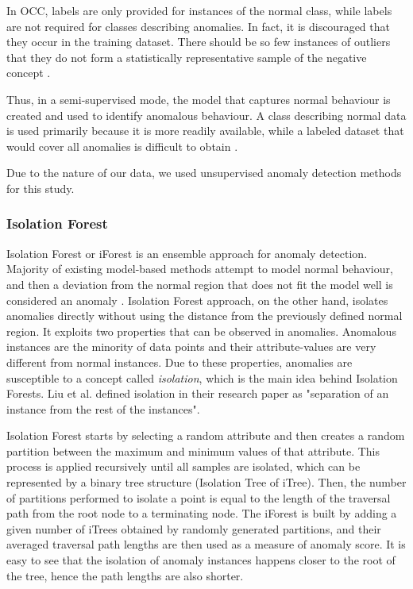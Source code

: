 In OCC, labels are only provided for instances of the normal class, while labels are not required for classes describing anomalies. In fact, it is discouraged that they occur in the training dataset. There should be so few instances of outliers that they do not form a statistically representative sample of the negative concept \cite{khan_madden_2014}.
 
Thus, in a semi-supervised mode, the model that captures normal behaviour is created and used to identify anomalous behaviour. A class describing normal data is used primarily because it is more readily available, while a labeled dataset that would cover all anomalies is difficult to obtain \cite{cvbakv2009}.
 
Due to the nature of our data, we used unsupervised anomaly detection methods for this study.

\subsubsection{Isolation Forest}
\label{section:lrIsolationForest}
Isolation Forest or iForest \cite{liu2012isolation} is an ensemble approach for anomaly detection. Majority of existing model-based methods attempt to model normal behaviour, and then a deviation from the normal region that does not fit the model well is considered an anomaly \cite{introToDataMining2005}. Isolation Forest approach, on the other hand, isolates anomalies directly without using the distance from the previously defined normal region. It exploits two properties that can be observed in anomalies. Anomalous instances are the minority of data points and their attribute-values are very different from normal instances. Due to these properties, anomalies are susceptible to a concept called \textit{isolation}, which is the main idea behind Isolation Forests. Liu et al. \cite{liu2012isolation} defined isolation in their research paper as "separation of an instance from the rest of the instances".

Isolation Forest starts by selecting a random attribute and then creates a random partition between the maximum and minimum values of that attribute. This process is applied recursively until all samples are isolated, which can be represented by a binary tree structure (Isolation Tree of iTree). Then, the number of partitions performed to isolate a point is equal to the length of the traversal path from the root node to a terminating node. The iForest is built by adding a given number of iTrees obtained by randomly generated partitions, and their averaged traversal path lengths are then used as a measure of anomaly score. It is easy to see that the isolation of anomaly instances happens closer to the root of the tree, hence the path lengths are also shorter.

